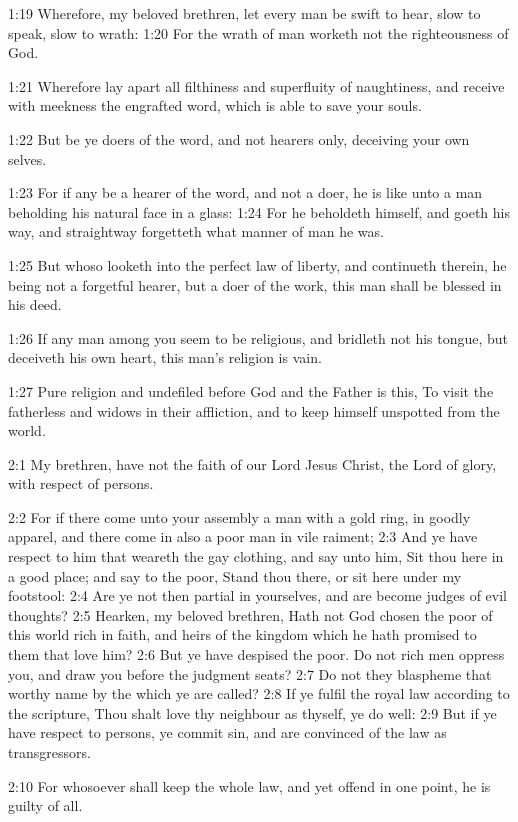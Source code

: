 1:19 Wherefore, my beloved brethren, let every man be swift to hear, slow to speak, slow to wrath: 1:20 For the wrath of man worketh not the righteousness of God.

1:21 Wherefore lay apart all filthiness and superfluity of naughtiness, and receive with meekness the engrafted word, which is able to save your souls.

1:22 But be ye doers of the word, and not hearers only, deceiving your own selves.

1:23 For if any be a hearer of the word, and not a doer, he is like unto a man beholding his natural face in a glass: 1:24 For he beholdeth himself, and goeth his way, and straightway forgetteth what manner of man he was.

1:25 But whoso looketh into the perfect law of liberty, and continueth therein, he being not a forgetful hearer, but a doer of the work, this man shall be blessed in his deed.

1:26 If any man among you seem to be religious, and bridleth not his tongue, but deceiveth his own heart, this man's religion is vain.

1:27 Pure religion and undefiled before God and the Father is this, To visit the fatherless and widows in their affliction, and to keep himself unspotted from the world.

2:1 My brethren, have not the faith of our Lord Jesus Christ, the Lord of glory, with respect of persons.

2:2 For if there come unto your assembly a man with a gold ring, in goodly apparel, and there come in also a poor man in vile raiment; 2:3 And ye have respect to him that weareth the gay clothing, and say unto him, Sit thou here in a good place; and say to the poor, Stand thou there, or sit here under my footstool: 2:4 Are ye not then partial in yourselves, and are become judges of evil thoughts?  2:5 Hearken, my beloved brethren, Hath not God chosen the poor of this world rich in faith, and heirs of the kingdom which he hath promised to them that love him?  2:6 But ye have despised the poor. Do not rich men oppress you, and draw you before the judgment seats?  2:7 Do not they blaspheme that worthy name by the which ye are called?  2:8 If ye fulfil the royal law according to the scripture, Thou shalt love thy neighbour as thyself, ye do well: 2:9 But if ye have respect to persons, ye commit sin, and are convinced of the law as transgressors.

2:10 For whosoever shall keep the whole law, and yet offend in one point, he is guilty of all.

